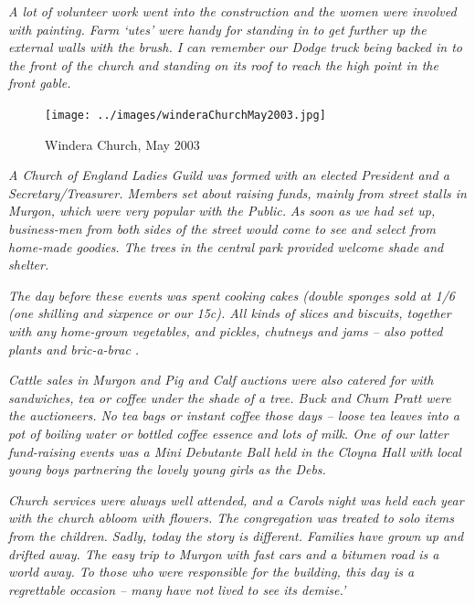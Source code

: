 \emph{A lot of volunteer work went into the construction and the women were involved with painting. Farm `utes' were handy for standing in to get further up the external walls with the brush. I can remember our Dodge truck being backed in to the front of the church and standing on its roof to reach the high point in the front gable.}









\begin{figure}[!htb]
\begin{center}
\texttt{[image: ../images/winderaChurchMay2003.jpg]}
\caption{Windera Church, May 2003}
\end{center}
\end{figure}




\emph{A Church of England Ladies Guild was formed with an elected President and a Secretary/Treasurer. Members set about raising funds, mainly from street stalls in Murgon, which were very popular with the Public.} \emph{As soon as we had set up, business-men from both sides of the street would come to see and select from home-made goodies. The trees in the central park provided welcome shade and shelter.}



\emph{The day before these events was spent cooking cakes (double sponges sold at 1/6 (one shilling and sixpence or our 15c). All kinds of slices and biscuits, together with any home-grown vegetables, and pickles, chutneys and jams -- also potted plants and bric-a-brac .}



\emph{Cattle sales in Murgon and Pig and Calf auctions were also catered for with sandwiches, tea or coffee under the shade of a tree. Buck and Chum Pratt were the auctioneers. No tea bags or instant coffee those days -- loose tea leaves into a pot of boiling water or bottled coffee essence and lots of milk. One of our latter fund-raising events was a Mini Debutante Ball held in the Cloyna Hall with local young boys partnering the lovely young girls as the Debs.}



\emph{Church services were always well attended, and a Carols night was held each year with the church abloom with flowers. The congregation was treated to solo items from the children. Sadly, today the story is different. Families have grown up and drifted away. The easy trip to Murgon with fast cars and a bitumen road is a world away. To those who were responsible for the building, this day is a regrettable occasion -- many have not lived to see its demise.'}



